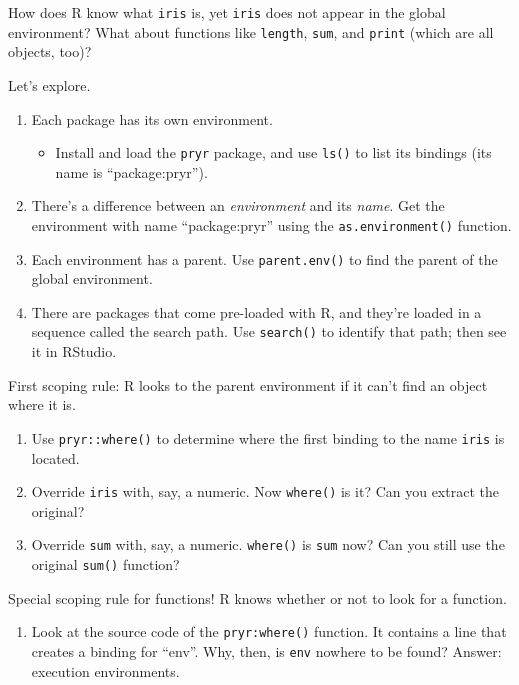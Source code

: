 \documentclass[]{article}
\providecommand{\tightlist}{%
  \setlength{\itemsep}{0pt}\setlength{\parskip}{0pt}}
\begin{document}
How does R know what \texttt{iris} is, yet \texttt{iris} does not appear
in the global environment? What about functions like \texttt{length},
\texttt{sum}, and \texttt{print} (which are all objects, too)?

Let's explore.

\begin{enumerate}
\def\labelenumi{\arabic{enumi}.}
\item
  Each package has its own environment.

  \begin{itemize}
  \tightlist
  \item
    Install and load the \texttt{pryr} package, and use \texttt{ls()} to
    list its bindings (its name is ``package:pryr'').
  \end{itemize}
\item
  There's a difference between an \emph{environment} and its
  \emph{name}. Get the environment with name ``package:pryr'' using the
  \texttt{as.environment()} function.
\item
  Each environment has a parent. Use \texttt{parent.env()} to find the
  parent of the global environment.
\item
  There are packages that come pre-loaded with R, and they're loaded in
  a sequence called the search path. Use \texttt{search()} to identify
  that path; then see it in RStudio.
\end{enumerate}

First scoping rule: R looks to the parent environment if it can't find
an object where it is.

\begin{enumerate}
\def\labelenumi{\arabic{enumi}.}
\setcounter{enumi}{4}
\item
  Use \texttt{pryr::where()} to determine where the first binding to the
  name \texttt{iris} is located.
\item
  Override \texttt{iris} with, say, a numeric. Now \texttt{where()} is
  it? Can you extract the original?
\item
  Override \texttt{sum} with, say, a numeric. \texttt{where()} is
  \texttt{sum} now? Can you still use the original \texttt{sum()}
  function?
\end{enumerate}

Special scoping rule for functions! R knows whether or not to look for a
function.

\begin{enumerate}
\def\labelenumi{\arabic{enumi}.}
\setcounter{enumi}{7}
\tightlist
\item
  Look at the source code of the \texttt{pryr:where()} function. It
  contains a line that creates a binding for ``env''. Why, then, is
  \texttt{env} nowhere to be found? Answer: execution environments.
\end{enumerate}
\end{document}
